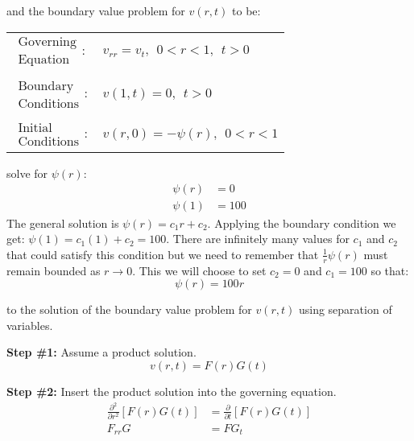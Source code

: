 \vspace{2.0cm}

\noindent and the boundary value problem for $v(r,t)$ to be:
\begin{table}[h]
\begin{tabular}{l l}
$\substack{\text{Governing} \\\text{Equation}}: $& $v_{rr} = v_t, \ \ 0<r<1, \ \ t>0$ \\
& \\
$\substack{\text{Boundary} \\ \text{Conditions}}: $& $v(1,t)=0, \ \ t>0$\\
& \\
$\substack{\text{Initial} \\ \text{Conditions}}: $ & $v(r,0) = -\psi(r), \ \ 0<r<1 $ \\
\end{tabular}
\end{table} 

\vspace{0.25cm}

 solve for $\psi(r)$:
\begin{align*}
\psi(r) &= 0 \\
\psi(1) &= 100
\end{align*}
The general solution is $\psi(r) = c_1r + c_2$.  Applying the boundary condition we get: $\psi(1) = c_1(1) + c_2 = 100$. There are infinitely many values for $c_1$ and $c_2$ that could satisfy this condition but we need to remember that $\frac{1}{r}\psi(r)$ must remain bounded as $r \to 0$.  This we will choose to set $c_2 = 0$ and $c_1 = 100$ so that:
\begin{equation}
\psi(r) = 100r
\label{eq:lec35-psi-sol}
\end{equation}

 to the solution of the boundary value problem for $v(r,t)$ using separation of variables.

\vspace{0.25cm}

\noindent\textbf{Step \#1:} Assume a product solution.
\begin{equation*}
v(r,t) = F(r)G(t)
\end{equation*}

\vspace{0.25cm}

\noindent\textbf{Step \#2:} Insert the product solution into the governing equation.
\begin{align*}
\frac{\partial^2}{\partial r^2}\left[F(r)G(t)\right] &= \frac{\partial}{\partial t}\left[F(r)G(t)\right] \\
F_{rr}G &= FG_t
\end{align*}



